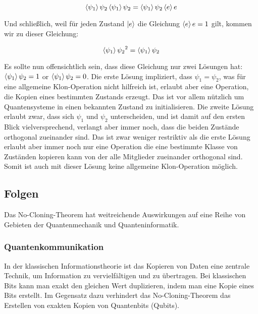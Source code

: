 \begin{equation}
    \braket{\psi_1}{\psi_2}\braket{\psi_1}{\psi_2}=\braket{\psi_1}{\psi_2}\braket{e}{e}
    \label{eq:scalar_equals}
\end{equation}

Und schließlich, weil für jeden Zustand $\ket{e}$ die Gleichung $\braket{e}{e} = 1$ gilt, kommen wir zu dieser Gleichung:

\begin{equation}
    \braket{\psi_1}{\psi_2}^2 = \braket{\psi_1}{\psi_2}
    \label{eq:square_equals_single}
\end{equation}

Es sollte nun offensichtlich sein, dass diese Gleichung nur zwei Lösungen hat:
$\braket{\psi_1}{\psi_2} = 1$ or $\braket{\psi_1}{\psi_2} = 0$.
Die erste Lösung impliziert, dass $\psi_1 = \psi_2$, was für eine allgemeine Klon-Operation nicht hilfreich ist, erlaubt aber eine
Operation, die Kopien eines bestimmten Zustands erzeugt.
Das ist vor allem nützlich um Quantensysteme in einen bekannten Zustand zu initialisieren.
Die zweite Lösung erlaubt zwar, dass sich $\psi_1$ und $\psi_2$ unterscheiden, und ist damit auf den ersten Blick
vielversprechend, verlangt aber immer noch, dass die beiden Zustände orthogonal zueinander sind.
Das ist zwar weniger restriktiv als die erste Lösung erlaubt aber immer noch nur eine Operation die eine bestimmte Klasse
von Zuständen kopieren kann von der alle Mitglieder zueinander orthogonal sind.
Somit ist auch mit dieser Lösung keine allgemeine Klon-Operation möglich.
\subsection{Folgen}\label{subsec:implications}
Das No-Cloning-Theorem hat weitreichende Auswirkungen auf eine Reihe von Gebieten der
Quantenmechanik und Quanteninformatik.

\subsubsection{Quantenkommunikation}
In der klassischen Informationstheorie ist das Kopieren von Daten eine zentrale Technik, um Information zu vervielfältigen und zu übertragen.
Bei klassischen Bits kann man exakt den gleichen Wert duplizieren, indem man eine Kopie eines Bits erstellt.
Im Gegensatz dazu verhindert das No-Cloning-Theorem das Erstellen von exakten Kopien von Quantenbits (Qubits).\\

